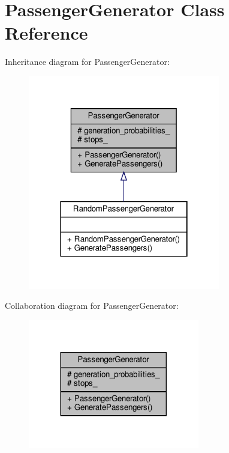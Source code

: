 \hypertarget{classPassengerGenerator}{}\section{Passenger\+Generator Class Reference}
\label{classPassengerGenerator}


Inheritance diagram for Passenger\+Generator\+:\nopagebreak
\begin{figure}[H]
\begin{center}
\leavevmode
\includegraphics[width=238pt]{classPassengerGenerator__inherit__graph}
\end{center}
\end{figure}


Collaboration diagram for Passenger\+Generator\+:\nopagebreak
\begin{figure}[H]
\begin{center}
\leavevmode
\includegraphics[width=212pt]{classPassengerGenerator__coll__graph}
\end{center}
\end{figure}
